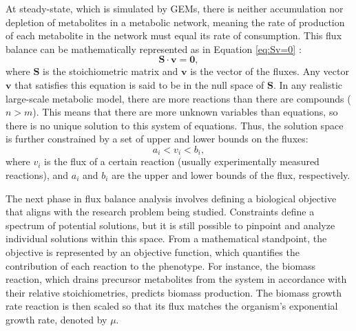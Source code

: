 
At steady-state, which is simulated by GEMs, there is neither accumulation nor depletion of metabolites in a metabolic network, meaning the rate of production of each metabolite in the network must equal its rate of consumption. 
This flux balance can be mathematically represented as in Equation \eqref{eq:Sv=0} \cite{Price2004}:
\begin{equation}
    \mathbf{S}\cdot \mathbf{v} = \mathbf{0},
    \label{eq:Sv=0}
\end{equation}
where $\mathbf{S}$ is the stoichiometric matrix and $\mathbf{v}$ is the vector of the fluxes.
Any vector $\mathbf{v}$ that satisfies this equation is said to be in the null space of $\mathbf{S}$. In any realistic large-scale metabolic model, there are more reactions than there are compounds ($n > m$). This means that there are more unknown variables than equations, so there is no unique solution to this system of equations. \cite{Orth2010} Thus, the solution space is further constrained by a set of upper and lower bounds on the fluxes: 
\begin{equation}
    a_i < v_i < b_i,
    \label{eq:bounds}
\end{equation}
where $v_i$ is the flux of a certain reaction (usually experimentally measured reactions), and $a_i$ and $b_i$ are the upper and lower bounds of the flux, respectively.

The next phase in flux balance analysis involves defining a biological objective that aligns with the research problem being studied. Constraints define a spectrum of potential solutions, but it is still possible to pinpoint and analyze individual solutions within this space. From a mathematical standpoint, the objective is represented by an objective function, which quantifies the contribution of each reaction to the phenotype. For instance, the biomass reaction, which drains precursor metabolites from the system in accordance with their relative stoichiometries, predicts biomass production. The biomass growth rate reaction is then scaled so that its flux matches the organism's exponential growth rate, denoted by $\mu$. \cite{Orth2010}

